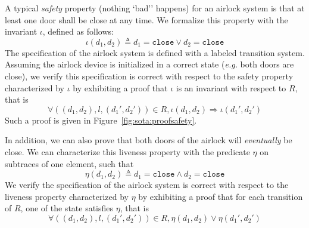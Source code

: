 \begin{example}
  A typical \emph{safety} property (nothing `bad'' happens) for an airlock
  system is that at least one door shall be close at any time.
  We formalize this property with the invariant \( \iota \), defined as follows:
  \[
    \iota( d_1, d_2) \triangleq d_1 = \mathtt{close} \vee d_2 = \mathtt{close}
  \]
  The specification of the airlock system is defined with a labeled transition
  system.
  Assuming the airlock device is initialized in a correct state (\emph{e.g.}
  both doors are close), we verify this specification is correct with respect to
  the safety property characterized by \( \iota \) by exhibiting a proof that
  \( \iota \) is an invariant with respect to \( R \), that is
  \[
    \forall ((d_1, d_2), l, (d_1', d_2')) \in R, \iota(d_1, d_2) \Rightarrow
    \iota(d_1', d_2')
  \]
  Such a proof is given in Figure~\ref{fig:sota:proofsafety}.

  In addition, we can also prove that both doors of the airlock will
  \emph{eventually} be close.
  We can characterize this liveness property with the predicate \( \eta \) on
  subtraces of one element, such that
  \[
    \eta(d_1, d_2) \triangleq d_1 = \mathtt{close} \wedge d_2 = \mathtt{close}
  \]
  We verify the specification of the airlock system is correct with respect to
  the liveness property characterized by \( \eta \) by exhibiting a proof that
  for each transition of \( R \), one of the state satisfies \( \eta \), that is
  \[
    \forall ((d_1, d_2), l, (d_1', d_2')) \in R, \eta(d_1, d_2) \vee \eta(d_1',
    d_2')
  \]

\end{example}

